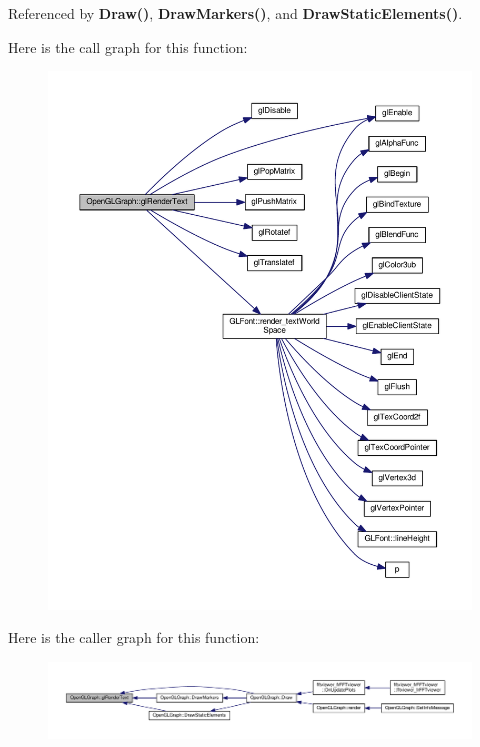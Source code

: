 Referenced by {\bf Draw()}, {\bf Draw\+Markers()}, and {\bf Draw\+Static\+Elements()}.



Here is the call graph for this function\+:
\nopagebreak
\begin{figure}[H]
\begin{center}
\leavevmode
\includegraphics[width=350pt]{d9/d73/classOpenGLGraph_a4670744215bd7f9f79aef761b42e783b_cgraph}
\end{center}
\end{figure}




Here is the caller graph for this function\+:
\nopagebreak
\begin{figure}[H]
\begin{center}
\leavevmode
\includegraphics[width=350pt]{d9/d73/classOpenGLGraph_a4670744215bd7f9f79aef761b42e783b_icgraph}
\end{center}
\end{figure}


